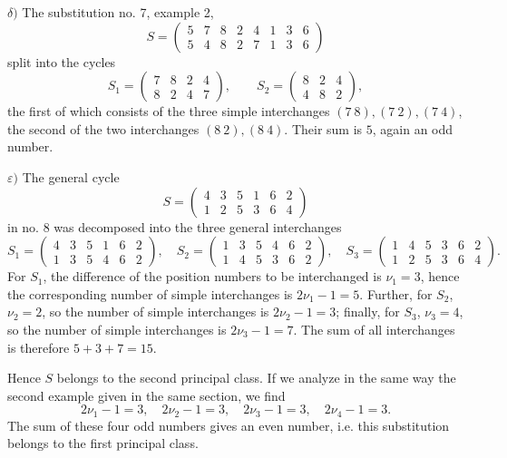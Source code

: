 \documentclass[10pt]{article}
\begin{document}
\(\delta)\) The substitution no. 7, example 2,
\[
S=\begin{pmatrix}5&7&8&2&4&1&3&6\\5&4&8&2&7&1&3&6\end{pmatrix}
\]
split into the cycles
\[
S_1=\begin{pmatrix}7&8&2&4\\8&2&4&7\end{pmatrix},\qquad
S_2=\begin{pmatrix}8&2&4\\4&8&2\end{pmatrix},
\]
the first of which consists of the three simple interchanges \((7\ 8),(7\ 2),(7\ 4)\), the second of the two interchanges \((8\ 2),(8\ 4)\). Their sum is \(5\), again an odd number.

\(\varepsilon)\) The general cycle
\[
S=\begin{pmatrix}4&3&5&1&6&2\\1&2&5&3&6&4\end{pmatrix}
\]
in no. 8 was decomposed into the three general interchanges
\[
S_1=\begin{pmatrix}4&3&5&1&6&2\\1&3&5&4&6&2\end{pmatrix},\quad
S_2=\begin{pmatrix}1&3&5&4&6&2\\1&4&5&3&6&2\end{pmatrix},\quad
S_3=\begin{pmatrix}1&4&5&3&6&2\\1&2&5&3&6&4\end{pmatrix}.
\]
For \(S_1\), the difference of the position numbers to be interchanged is \(\nu_1=3\), hence the corresponding number of simple interchanges is \(2\nu_1-1=5\). Further, for \(S_2\), \(\nu_2=2\), so the number of simple interchanges is \(2\nu_2-1=3\); finally, for \(S_3\), \(\nu_3=4\), so the number of simple interchanges is \(2\nu_3-1=7\). The sum of all interchanges is therefore \(5+3+7=15\).

Hence \(S\) belongs to the second principal class. If we analyze in the same way the second example given in the same section, we find
\[
2\nu_1-1=3,\quad 2\nu_2-1=3,\quad 2\nu_3-1=3,\quad 2\nu_4-1=3.
\]
The sum of these four odd numbers gives an even number, i.e. this substitution belongs to the first principal class.
\end{document}
